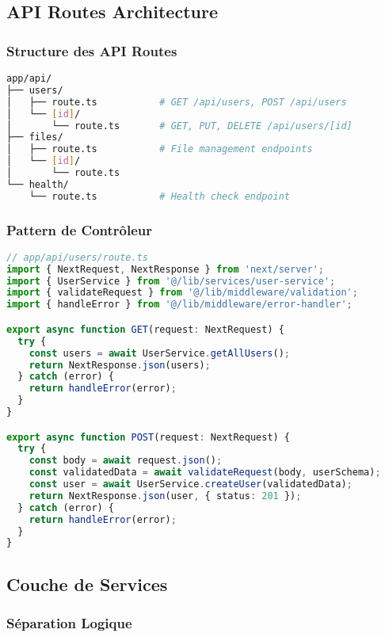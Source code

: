 \subsection{API Routes Architecture}

\subsubsection{Structure des API Routes}

\begin{lstlisting}[language=bash, caption=Organisation des API Routes]
app/api/
├── users/
│   ├── route.ts           # GET /api/users, POST /api/users
│   └── [id]/
│       └── route.ts       # GET, PUT, DELETE /api/users/[id]
├── files/
│   ├── route.ts           # File management endpoints
│   └── [id]/
│       └── route.ts
└── health/
    └── route.ts           # Health check endpoint
\end{lstlisting}

\subsubsection{Pattern de Contrôleur}

\begin{lstlisting}[language=TypeScript, caption=Structure d'un contrôleur API]
// app/api/users/route.ts
import { NextRequest, NextResponse } from 'next/server';
import { UserService } from '@/lib/services/user-service';
import { validateRequest } from '@/lib/middleware/validation';
import { handleError } from '@/lib/middleware/error-handler';

export async function GET(request: NextRequest) {
  try {
    const users = await UserService.getAllUsers();
    return NextResponse.json(users);
  } catch (error) {
    return handleError(error);
  }
}

export async function POST(request: NextRequest) {
  try {
    const body = await request.json();
    const validatedData = await validateRequest(body, userSchema);
    const user = await UserService.createUser(validatedData);
    return NextResponse.json(user, { status: 201 });
  } catch (error) {
    return handleError(error);
  }
}
\end{lstlisting}

\subsection{Couche de Services}

\subsubsection{Séparation Logique}

